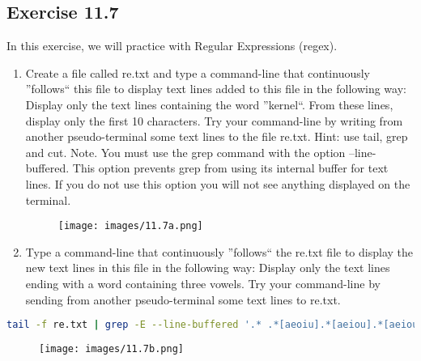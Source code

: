 \documentclass[12pt, titlepage,]{article}
\begin{document}
\subsection{Exercise 11.7}
In this exercise, we will practice with Regular Expressions (regex). 
\begin{enumerate}
    \item Create a file called re.txt and type a command-line that continuously ”follows“ this file to display text lines added to this file in the following way: Display only the text lines containing the word ”kernel“. From these lines, display only the first 10 characters. Try your command-line by writing from another pseudo-terminal some text lines to the file re.txt. Hint: use tail, grep and cut. Note. You must use the grep command with the option --line-buffered. This option prevents grep from using its internal buffer for text lines. If you do not use this option you will not see anything displayed on the terminal. 
    \begin{figure}[h] %
    \centering
    {\texttt{[image: images/11.7a.png]}}
    \end{figure} 
    \clearpage
    

   \item Type a command-line that continuously ”follows“ the re.txt file to display the new text lines in this file in the following way: Display only the text lines ending with a word containing three vowels. Try your command-line by sending from another pseudo-terminal some text lines to re.txt.
\end{enumerate}
\begin{lstlisting}[language=Bash]
tail -f re.txt | grep -E --line-buffered '.* .*[aeoiu].*[aeiou].*[aeiou]$'
\end{lstlisting}
    \begin{figure}[h] %
    \centering
    {\texttt{[image: images/11.7b.png]}}
    \end{figure} 
\clearpage
\end{document}
